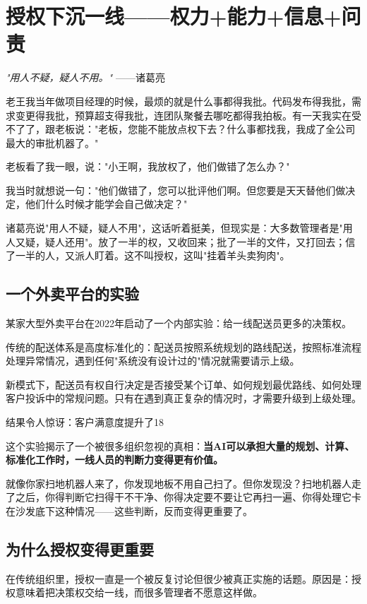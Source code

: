 \chapter{授权下沉一线——权力+能力+信息+问责}


\textit{"用人不疑，疑人不用。"}
——诸葛亮


老王我当年做项目经理的时候，最烦的就是什么事都得我批。代码发布得我批，需求变更得我批，预算超支得我批，连团队聚餐去哪吃都得我拍板。有一天我实在受不了了，跟老板说："老板，您能不能放点权下去？什么事都找我，我成了全公司最大的审批机器了。"

老板看了我一眼，说："小王啊，我放权了，他们做错了怎么办？"

我当时就想说一句："他们做错了，您可以批评他们啊。但您要是天天替他们做决定，他们什么时候才能学会自己做决定？"

诸葛亮说"用人不疑，疑人不用"，这话听着挺美，但现实是：大多数管理者是"用人又疑，疑人还用"。放了一半的权，又收回来；批了一半的文件，又打回去；信了一半的人，又派人盯着。这不叫授权，这叫"挂着羊头卖狗肉"。

\section{一个外卖平台的实验}


某家大型外卖平台在2022年启动了一个内部实验：给一线配送员更多的决策权。

传统的配送体系是高度标准化的：配送员按照系统规划的路线配送，按照标准流程处理异常情况，遇到任何"系统没有设计过的"情况就需要请示上级。

新模式下，配送员有权自行决定是否接受某个订单、如何规划最优路线、如何处理客户投诉中的常规问题。只有在遇到真正复杂的情况时，才需要升级到上级处理。

结果令人惊讶：客户满意度提升了18%

这个实验揭示了一个被很多组织忽视的真相：\textbf{当AI可以承担大量的规划、计算、标准化工作时，一线人员的判断力变得更有价值。}

就像你家扫地机器人来了，你发现地板不用自己扫了。但你发现没？扫地机器人走了之后，你得判断它扫得干不干净、你得决定要不要让它再扫一遍、你得处理它卡在沙发底下这种情况——这些判断，反而变得更重要了。

\section{为什么授权变得更重要}


在传统组织里，授权一直是一个被反复讨论但很少被真正实施的话题。原因是：授权意味着把决策权交给一线，而很多管理者不愿意这样做。

